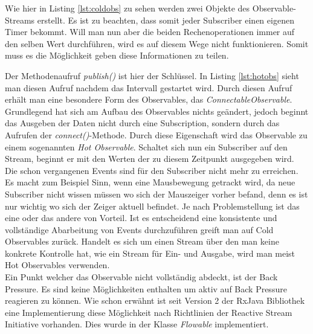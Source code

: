 Wie hier in Listing \ref{lst:coldobs} zu sehen werden zwei Objekte des Observable-Streams erstellt. Es ist zu beachten, dass somit jeder Subscriber einen eigenen Timer bekommt. Will man nun aber die beiden Rechenoperationen immer auf den selben Wert durchführen, wird es auf diesem Wege nicht funktionieren. Somit muss es die Möglichkeit geben diese Informationen zu teilen.

Der Methodenaufruf \textit{publish()} ist hier der Schlüssel. In Listing \ref{lst:hotobs} sieht man diesen Aufruf nachdem das Intervall gestartet wird. Durch diesen Aufruf erhält man eine besondere Form des Observables, das \textit{ConnectableObservable}. Grundlegend hat sich am Aufbau des Observables nichts geändert, jedoch beginnt das Ausgeben der Daten nicht durch eine Subscription, sondern durch das Aufrufen der \textit{connect()}-Methode. Durch diese Eigenschaft wird das Observable zu einem sogenannten \textit{Hot Observable}. Schaltet sich nun ein Subscriber auf den Stream, beginnt er mit den Werten der zu diesem Zeitpunkt ausgegeben wird. Die schon vergangenen Events sind für den Subscriber nicht mehr zu erreichen. Es macht zum Beispiel Sinn, wenn eine Mausbewegung getrackt wird, da neue Subscriber nicht wissen müssen wo sich der Mauszeiger vorher befand, denn es ist nur wichtig wo sich der Zeiger aktuell befindet. Je nach Problemstellung ist das eine oder das andere von Vorteil. Ist es entscheidend eine konsistente und vollständige Abarbeitung von Events durchzuführen greift man auf Cold Observables zurück. Handelt es sich um einen Stream über den man keine konkrete Kontrolle hat, wie ein Stream für Ein- und Ausgabe, wird man meist Hot Observables verwenden. \\ Ein Punkt welcher das Observable nicht vollständig abdeckt, ist der Back Pressure. Es sind keine Möglichkeiten enthalten um aktiv auf Back Pressure reagieren zu können. Wie schon erwähnt ist seit Version 2 der RxJava Bibliothek eine Implementierung diese Möglichkeit nach Richtlinien der Reactive Stream Initiative vorhanden. Dies wurde in der Klasse \textit{Flowable} implementiert.
